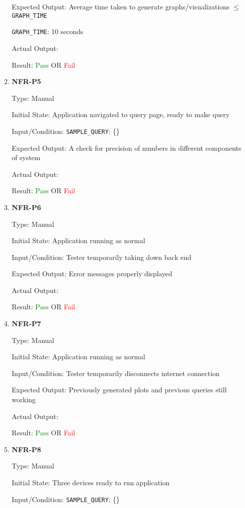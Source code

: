 \documentclass[12pt, titlepage]{article}
\begin{document}
\begin{enumerate}
Expected Output: Average time taken to generate graphs/visualizations $\leq$
\texttt{GRAPH\_TIME}

\texttt{GRAPH\_TIME}: 10 seconds

Actual Output:

Result: \textcolor{green}{Pass} OR \textcolor{red}{Fail}

\item{\textbf{NFR-P5}} \label{NFR:P5}

Type: Manual

Initial State: Application navigated to query page, ready to make query

Input/Condition: \texttt{SAMPLE\_QUERY}: \{\}

Expected Output: A check for precision of numbers in different components of
system

Actual Output:

Result: \textcolor{green}{Pass} OR \textcolor{red}{Fail}

\item{\textbf{NFR-P6}} \label{NFR:P6}

Type: Manual

Initial State: Application running as normal

Input/Condition: Tester temporarily taking down back end

Expected Output: Error messages properly displayed

Actual Output:

Result: \textcolor{green}{Pass} OR \textcolor{red}{Fail}

\item{\textbf{NFR-P7}} \label{NFR:P7}

Type: Manual

Initial State: Application running as normal

Input/Condition: Tester temporarily disconnects internet connection

Expected Output: Previously generated plots and previous queries still working

Actual Output:

Result: \textcolor{green}{Pass} OR \textcolor{red}{Fail}

\item{\textbf{NFR-P8}} \label{NFR:P8}

Type: Manual

Initial State: Three devices ready to run application

Input/Condition: \texttt{SAMPLE\_QUERY}: \{\}


\end{enumerate}
\end{document}
